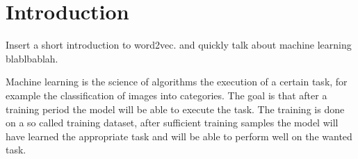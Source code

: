 \chapter{Introduction}\label{chap:introduction}

Insert a short introduction to word2vec. and quickly talk about machine learning blablbablah. 


Machine learning is the science of algorithms the execution of a certain task, for example the classification of images into categories. The goal is that after a training period the model will be able to execute the task. The training is done on a so called training dataset, after sufficient training samples the model will have learned the appropriate task and will be able to perform well on the wanted task. 














